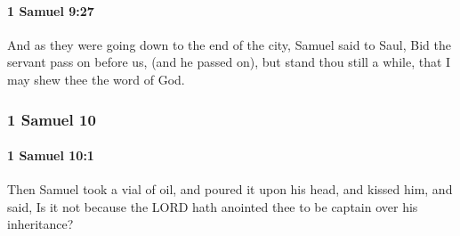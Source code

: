 		\paragraph{1 Samuel 9:27} %
			\label{1SAMUEL-9-27}

			And as they were going down to the end of the city, Samuel said to Saul, Bid the servant pass on before us, (and he passed on), but stand thou still a while, that I may shew thee the word of God.

	\subsubsection{1 Samuel 10} %
		\label{1SAMUEL-10}

		\paragraph{1 Samuel 10:1} %
			\label{1SAMUEL-10-1}

			Then Samuel took a vial of oil, and poured it upon his head, and kissed him, and said, Is it not because the LORD hath anointed thee to be captain over his inheritance?

